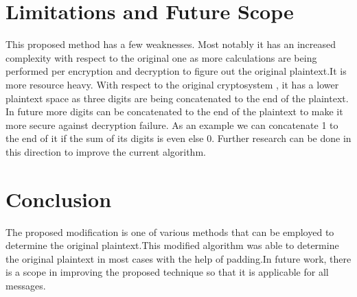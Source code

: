 \documentclass[letterpaper, 12 pt, conference]{ieeeconf}  %
\begin{document}
\section{Limitations and Future Scope}
This proposed method has a few weaknesses. Most notably it has an increased complexity with respect to the original one as more calculations are being performed per encryption and decryption to figure out the original plaintext.It is more resource heavy. With respect to the original cryptosystem , it has a lower plaintext space as three digits are being concatenated to the end of the plaintext.
In future more digits can be concatenated to the end of the plaintext to make it more secure against decryption failure. As an example we can concatenate 1 to the end of it if the sum of its digits is even else 0. Further research can be done in this direction to improve the current algorithm.








\section{Conclusion}
The proposed modification is one of various methods that can be employed to determine the original plaintext.This modified algorithm was able to determine the original plaintext in most cases with the help of padding.In future work, there is a scope in improving the proposed technique so that it is applicable for all messages.


     
\end{document}
